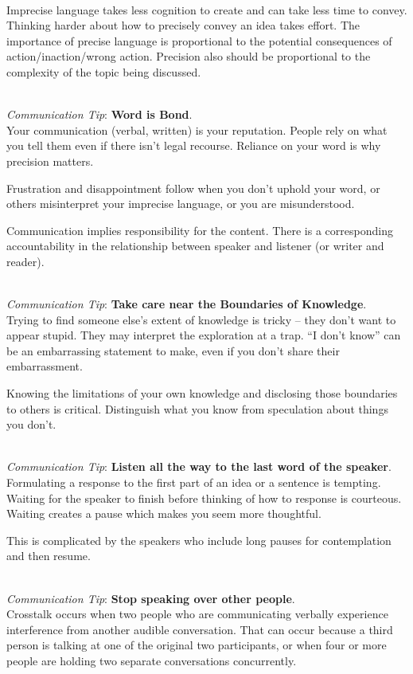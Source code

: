 \ \\
Imprecise language takes less cognition to create and can take less time to convey. Thinking harder about how to precisely convey an idea takes effort. 
The importance of precise language is proportional to the potential consequences of action/inaction/wrong action.
Precision also should be proportional to the complexity of the topic being discussed. 

\ \\
\textit{Communication Tip}: \textbf{Word is Bond\label{sec:word-is-bond}}.\\
Your communication (verbal, written) is your reputation. People rely on what you tell them even if there isn't legal recourse. Reliance on your word is why precision matters. 

Frustration and disappointment follow when you don't uphold your word, or others misinterpret your imprecise language, or you are misunderstood.

Communication implies responsibility for the content.  There is a corresponding accountability in the relationship between speaker and listener (or writer and reader).

\ \\
\textit{Communication Tip}: \textbf{Take care near the Boundaries of Knowledge}.\\
Trying to find someone else's extent of knowledge is tricky -- they don't want to appear stupid. They may interpret the exploration at a trap. ``I don't know'' can be an embarrassing statement to make, even if you don't share their embarrassment. 

Knowing the limitations of your own knowledge and disclosing those boundaries to others is critical. Distinguish what you know from speculation about things you don't. 

\ \\
\textit{Communication Tip}: \textbf{Listen all the way to the last word of the speaker}.\\
Formulating a response to the first part of an idea or a sentence is tempting. Waiting for the speaker to finish before thinking of how to response is courteous. Waiting creates a pause which makes you seem more thoughtful. 

This is complicated by the speakers who include long pauses for contemplation and then resume. 

\ \\
\textit{Communication Tip}: \textbf{Stop speaking over other people\label{sec:crosstalk}}.\\
Crosstalk occurs when two people who are communicating verbally experience interference from another audible conversation. That can occur because a third person is talking at one of the original two participants, or when four or more people are holding two separate conversations concurrently. 

